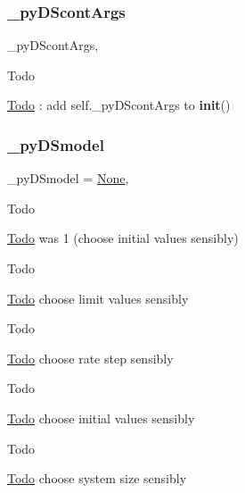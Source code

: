 \subsubsection{\texorpdfstring{\+\_\+py\+D\+Scont\+Args}{\_pyDScontArgs}}
{\footnotesize\ttfamily \+\_\+py\+D\+Scont\+Args\hspace{0.3cm}{\ttfamily [static]}, {\ttfamily [private]}}

\begin{DoxyRefDesc}{Todo}
\item[\hyperlink{todo__todo000036}{Todo}]\+: add self.\+\_\+py\+D\+Scont\+Args to {\bfseries init}() \end{DoxyRefDesc}
\mbox{\label{class_mu_mo_t_1_1_mu_mo_tbifurcation_view_a9e9a430da6d323cc4411c070e0c7eee5}} 
\subsubsection{\texorpdfstring{\+\_\+py\+D\+Smodel}{\_pyDSmodel}}
{\footnotesize\ttfamily \+\_\+py\+D\+Smodel = \hyperlink{class_mu_mo_t_1_1_mu_mo_tbifurcation_view_ac7485dcc8d256a6f197ed7802687f252}{None}\hspace{0.3cm}{\ttfamily [static]}, {\ttfamily [private]}}

\begin{DoxyRefDesc}{Todo}
\item[\hyperlink{todo__todo000040}{Todo}]was 1 (choose initial values sensibly) \end{DoxyRefDesc}
\begin{DoxyRefDesc}{Todo}
\item[\hyperlink{todo__todo000041}{Todo}]choose limit values sensibly \end{DoxyRefDesc}
\begin{DoxyRefDesc}{Todo}
\item[\hyperlink{todo__todo000042}{Todo}]choose rate step sensibly \end{DoxyRefDesc}
\begin{DoxyRefDesc}{Todo}
\item[\hyperlink{todo__todo000043}{Todo}]choose initial values sensibly \end{DoxyRefDesc}
\begin{DoxyRefDesc}{Todo}
\item[\hyperlink{todo__todo000044}{Todo}]choose system size sensibly \end{DoxyRefDesc}
\mbox{\label{class_mu_mo_t_1_1_mu_mo_tbifurcation_view_a45f0a60363e440604d8e5b08930eb7b5}} 
